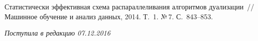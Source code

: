 \begin{multicols}{2}
{{\begin{thebibliography}{99}
      Статистически эффективная схема распараллеливания алгоритмов дуализации~//
       Машинное обучение и анализ данных, 2014.
    Т.~1. №\,7. С.~843--853.


\end{thebibliography}
} }

\end{multicols}

 \label{end\stat}

 \vspace*{-3pt}

\hfill{\small\textit{Поступила в редакцию  07.12.2016}}
\renewcommand{\figurename}{\protect\bf Рис.}
\renewcommand{\tablename}{\protect\bf Таблица}
